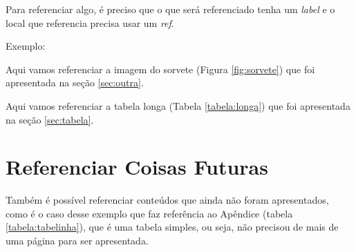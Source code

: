 Para referenciar algo, é preciso que o que será referenciado tenha um \textit{label} e o local que referencia precisa usar um \textit{ref}.

Exemplo:

Aqui vamos referenciar a imagem do sorvete (Figura \ref{fig:sorvete}) que foi apresentada na seção \ref{sec:outra}.

Aqui vamos referenciar a tabela longa (Tabela \ref{tabela:longa}) que foi apresentada na seção \ref{sec:tabela}.


\section{Referenciar Coisas Futuras}

Também é possível referenciar conteúdos que ainda não foram apresentados, como é o caso desse exemplo que faz referência ao Apêndice (tabela \ref{tabela:tabelinha}), que é uma tabela simples, ou seja, não precisou de mais de uma página para ser apresentada.